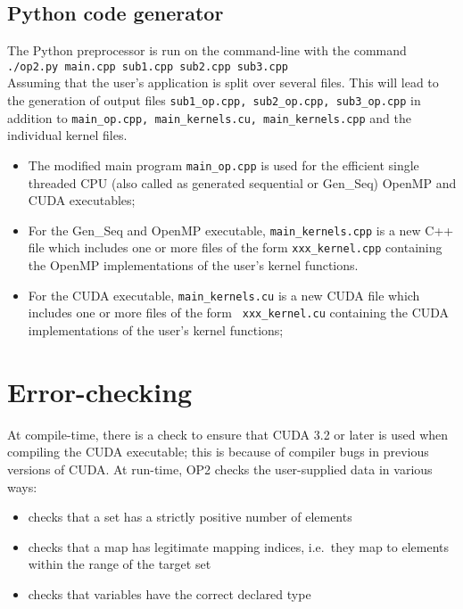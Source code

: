 \documentclass[11pt]{article}
\begin{document}

\subsection{Python code generator}

The Python preprocessor is run on the command-line with the command\\

{\tt ./op2.py main.cpp sub1.cpp sub2.cpp sub3.cpp}\\

\noindent Assuming that the user's application is split over several files. This will lead to the generation of output
files {\tt sub1\_op.cpp, sub2\_op.cpp, sub3\_op.cpp} in addition to {\tt main\_op.cpp, main\_kernels.cu,
main\_kernels.cpp} and the individual kernel files.

\begin{itemize}
\item
The modified main program {\tt main\_op.cpp} is used for the efficient single threaded CPU (also called as
generated sequential or Gen\_Seq) OpenMP and CUDA executables;

\item
For the Gen\_Seq and OpenMP executable, {\tt main\_kernels.cpp} is a new C++ file which includes one or more files of
the form {\tt xxx\_kernel.cpp} containing the OpenMP implementations of the user's kernel functions.

\item
For the CUDA executable, {\tt main\_kernels.cu} is a new CUDA file which includes one or more files of the form {\tt
xxx\_kernel.cu} containing the CUDA implementations of the user's kernel functions;

\end{itemize}



\section{Error-checking}

At compile-time, there is a check to ensure that CUDA 3.2 or later is used
when compiling the CUDA executable; this is because of compiler bugs in previous
versions of CUDA. At run-time, OP2 checks the user-supplied data in various ways:
\begin{itemize}
\item
checks that a set has a strictly positive number of elements
\item
checks that a map has legitimate mapping indices,
i.e.~they map to elements within the range of the target set
\item
checks that variables have the correct declared type
\end{itemize}
\end{document}
